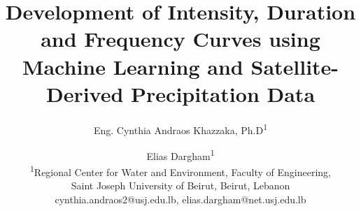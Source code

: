 \documentclass[
  12pt,
  a4paper,
  twocolumn,
]{article}
\author{Eng. Cynthia Andraos Khazzaka, Ph.D\textsuperscript{1} \and Elias Dargham\textsuperscript{1} \\
\textsuperscript{1}Regional Center for Water and Environment, Faculty of Engineering, \\
Saint Joseph University of Beirut, Beirut, Lebanon \\
cynthia.andraos2@usj.edu.lb, elias.dargham@net.usj.edu.lb}
\title{Development of Intensity, Duration and Frequency Curves using Machine Learning and Satellite-Derived Precipitation Data}
\date{}
\begin{document}
\onecolumn
\maketitle

\twocolumn





\onecolumn

\end{document}
